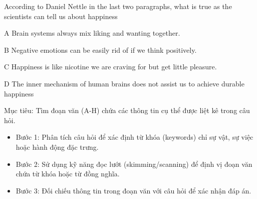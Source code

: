 \documentclass{../templateReading/cdreading}
\begin{document}
According to Daniel Nettle in the last two paragraphs, what is true as the scientists can tell us about happiness

A       Brain systems always mix liking and wanting together.

B       Negative emotions can be easily rid of if we think positively.

C       Happiness is like nicotine we are craving for but get little pleasure.

D      The inner mechanism of human brains does not assist us to achieve durable happiness



Mục tiêu: Tìm đoạn văn (A-H) chứa các thông tin cụ thể được liệt kê trong câu hỏi.

\begin{itemize}
\item Bước 1: Phân tích câu hỏi để xác định từ khóa (keywords) chỉ sự vật, sự việc hoặc hành động đặc trưng.
\item Bước 2: Sử dụng kỹ năng đọc lướt (skimming/scanning) để định vị đoạn văn chứa từ khóa hoặc từ đồng nghĩa.
\item Bước 3: Đối chiếu thông tin trong đoạn văn với câu hỏi để xác nhận đáp án.
\end{itemize}
\end{document}
